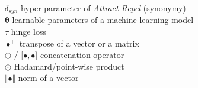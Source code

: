 \begin{tabbing}
	\> $\delta_{syn}$				\>	hyper-parameter of \textit{Attract-Repel} (synonymy)	\\[3mm]
	\> $\bm{\theta}$				\> 	learnable parameters	of a machine learning model	\\[3mm]
	\> $\tau$						\>	hinge loss									\\[3mm]
	\> $\bullet^{\intercal}$			\>	transpose of a vector or a matrix 				\\[3mm]
	\> $\oplus$ / [$\bullet, \bullet$]		\>	concatenation operator						\\[3mm]
	\> $\odot$						\>	Hadamard/point-wise product					\\[3mm]
	\> $\Vert \bullet \Vert$			\>	norm of a vector								\\	
\end{tabbing}